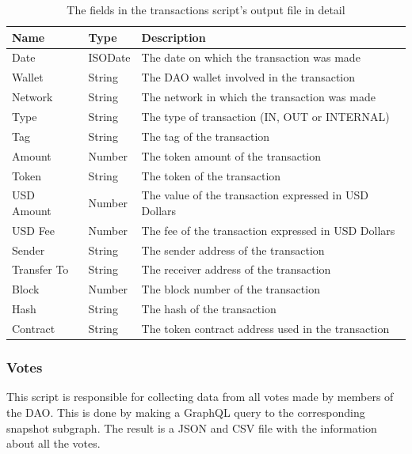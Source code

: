 \documentclass[MSE,Master,english]{twbook}%
\begin{document}
\begin{table}[H]
  \centering
  \begin{tabularx}{\textwidth}{|l|l|X|}
  \hline
  \textbf{Name} & \textbf{Type} & \textbf{Description}                                            \\ \hline
  Date        & ISODate & The date on which the transaction was made            \\ \hline
  Wallet      & String  & The DAO wallet involved in the transaction            \\ \hline
  Network     & String  & The network in which the transaction was made         \\ \hline
  Type        & String  & The type of transaction (IN, OUT or INTERNAL)         \\ \hline
  Tag         & String  & The tag of the transaction                            \\ \hline
  Amount      & Number  & The token amount of the transaction                   \\ \hline
  Token       & String  & The token of the transaction                          \\ \hline
  USD Amount  & Number  & The value of the transaction expressed in USD Dollars \\ \hline
  USD Fee     & Number  & The fee of the transaction expressed in USD Dollars   \\ \hline
  Sender      & String  & The sender address of the transaction                 \\ \hline
  Transfer To & String  & The receiver address of the transaction               \\ \hline
  Block       & Number  & The block number of the transaction                   \\ \hline
  Hash        & String  & The hash of the transaction                           \\ \hline
  Contract    & String  & The token contract address used in the transaction    \\ \hline
  \end{tabularx}
  \caption{The fields in the transactions script's output file in detail}
  \label{table:transactions}
\end{table}

\subsubsection{Votes\label{subsec_votes}}
This script is responsible for collecting data from all votes made by members of the DAO. This is done by making a GraphQL query to the corresponding snapshot subgraph. The result is a JSON and CSV file with the information about all the votes. \\
\end{document}

